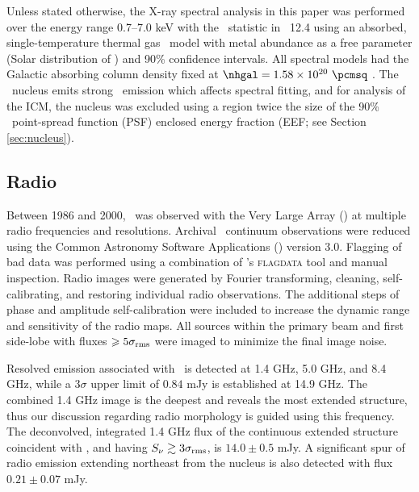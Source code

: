\documentclass[useAMS,usenatbib]{mn2e}
\begin{document}
Unless stated otherwise, the X-ray spectral analysis in this paper was
performed over the energy range 0.7--7.0 keV with the
\chisq\ statistic in \xspec\ 12.4 \citep{xspec} using an absorbed,
single-temperature thermal gas \mekal\ model \citep{mekal1} with metal
abundance as a free parameter (Solar distribution of \citealt{ag89})
and 90\% confidence intervals. All spectral models had the Galactic
absorbing column density fixed at $\nhgal = 1.58 \times 10^{20}
~\pcmsq$ \citep{lab}. The \irs\ nucleus emits strong \feka\ emission
which affects spectral fitting, and for analysis of the ICM, the
nucleus was excluded using a region twice the size of the 90\%
\cxo\ point-spread function (PSF) enclosed energy fraction (EEF; see
Section \ref{sec:nucleus}).

\subsection{Radio}
\label{sec:radio}

Between 1986 and 2000, \irs\ was observed with the Very Large Array
(\vla) at multiple radio frequencies and resolutions. Archival
\vla\ continuum observations were reduced using the Common Astronomy
Software Applications (\casa) version 3.0. Flagging of bad data was
performed using a combination of \casa's {\textsc{flagdata}} tool and
manual inspection. Radio images were generated by Fourier
transforming, cleaning, self-calibrating, and restoring individual
radio observations. The additional steps of phase and amplitude
self-calibration were included to increase the dynamic range and
sensitivity of the radio maps. All sources within the primary beam and
first side-lobe with fluxes $\ge 5\sigma_{\rm{rms}}$ were imaged to
minimize the final image noise.

Resolved emission associated with \irs\ is detected at 1.4 GHz, 5.0
GHz, and 8.4 GHz, while a $3\sigma$ upper limit of $0.84$ mJy is
established at 14.9 GHz. The combined 1.4 GHz image is the deepest and
reveals the most extended structure, thus our discussion regarding
radio morphology is guided using this frequency. The deconvolved,
integrated 1.4 GHz flux of the continuous extended structure
coincident with \irs, and having $S_{\nu} \ga 3\sigma_{\rm{rms}}$, is
$14.0 \pm 0.5$ mJy. A significant spur of radio emission extending
northeast from the nucleus is also detected with flux $0.21 \pm 0.07$
mJy.
\end{document}
